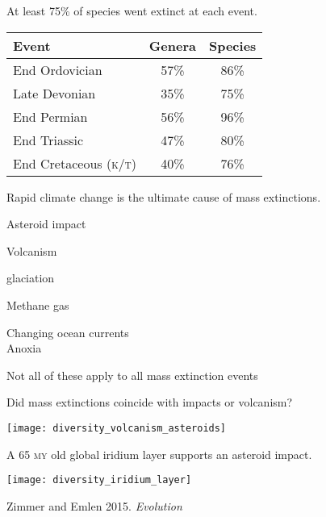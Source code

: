 \documentclass[t]{beamer}
\newcommand{\backskip}{\vspace{-0.5\baselineskip}}
\begin{document}

\begin{frame}{At least 75\% of species went extinct at each event.}



\centering

\begin{tabular}{@{}lcc@{}}
\toprule
Event & Genera & Species \tabularnewline
\midrule
End Ordovician & 57\% & 86\% \tabularnewline
Late Devonian & 35\%  & 75\% \tabularnewline
End Permian & 56\%  &  96\% \tabularnewline
End Triassic & 47\% & 80\% \tabularnewline
End Cretaceous \textsc{(k/t)} & 40\% & 76\% \tabularnewline
\bottomrule
\end{tabular}
\end{frame}


\begin{frame}{Rapid climate change is the ultimate cause of mass extinctions.}

\backskip
\begin{multicols}{2}
\hangpara Asteroid impact

\hangpara Volcanism

\hangpara glaciation

\hangpara Methane gas

\hangpara Changing ocean currents\\
\hspace*{1em} Anoxia

\columnbreak

\noindent Not all of these apply to all mass extinction events

\end{multicols}

\end{frame}



\begin{frame}{Did mass extinctions coincide with impacts or volcanism?}

\backskip

\centering

\texttt{[image: diversity\_volcanism\_asteroids]}


\end{frame}



\begin{frame}{A 65 \textsc{my} old global iridium layer supports an asteroid impact.}

\backskip

\centering

\texttt{[image: diversity\_iridium\_layer]}
	
\tinyfill \textcopyright Zimmer and Emlen 2015. \textit{Evolution}

\end{frame}
\end{document}
